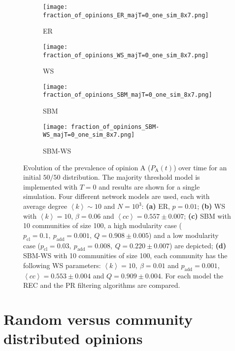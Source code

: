 \documentclass[11 pt , letterpaper , twoside , openright]{book}
\begin{document}
\begin{figure}[H]
  \begin{subfigure}[b]{0.49\textwidth}
    \caption{ER}
  	\texttt{[image: fraction\_of\_opinions\_ER\_majT=0\_one\_sim\_8x7.png]}
    \label{er_majT}
  \end{subfigure}
  \begin{subfigure}[b]{0.49\textwidth}
    \caption{WS}
  	\texttt{[image: fraction\_of\_opinions\_WS\_majT=0\_one\_sim\_8x7.png]}
    \label{ws_majT}
  \end{subfigure}
  \begin{subfigure}[b]{0.49\textwidth}
    \caption{SBM}
    \texttt{[image: fraction\_of\_opinions\_SBM\_majT=0\_one\_sim\_8x7.png]}
    \label{sbm_majT}
  \end{subfigure}
  \begin{subfigure}[b]{0.49\textwidth}
    \caption{SBM-WS}
    \texttt{[image: fraction\_of\_opinions\_SBM-WS\_majT=0\_one\_sim\_8x7.png]}
    \label{sbm-ws_majT}
  \end{subfigure}
  \captionsetup{format=plain}
  \caption[Evolution of the prevalence of opinion A ($P_\text{A}(t)$) over time for an initial $50/50$ opinion distribution. Results for one simulation of the majority threshold model with $T=0$.]{Evolution of the prevalence of opinion A ($P_\text{A}(t)$) over time for an initial $50/50$ distribution. The majority threshold model is implemented with $T=0$ and results are shown for a single simulation. Four different network models are used, each with average degree $\left<k\right> \sim 10$ and $N = 10^3$: \textbf{(a)} ER, $p=0.01$; \textbf{(b)} WS with $\left<k\right> = 10$, $\beta = 0.06$ and $\left<cc\right> = 0.557 \pm 0.007$; \textbf{(c)} SBM with 10 communities of size 100, a high modularity case ($p_{\text{cl}} = 0.1,\ p_{\text{add}} = 0.001,\ Q = 0.908 \pm 0.005$) and a low modularity case ($p_{\text{cl}} = 0.03,\ p_{\text{add}} = 0.008,\ Q = 0.220 \pm 0.007$) are depicted; \textbf{(d)} SBM-WS with 10 communities of size 100, each community has the following WS parameters: $\left<k\right> = 10,\ \beta = 0.01$ and $p_{\text{add}} = 0.001$, $\left<cc\right> = 0.553 \pm 0.004$ and $Q = 0.909 \pm 0.004$. For each model the REC and the PR filtering algorithms are compared.}
\label{ev_op_majT_one_sim}
\end{figure}

\section{Random versus community distributed opinions}
\end{document}
